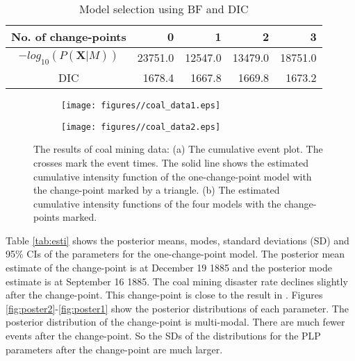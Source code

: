 \documentclass[12pt]{article}
\numberwithin{equation}{section}
\begin{document}
 \begin{table}[htbp]
   \centering
   \label{tbcoal}
   \caption{Model selection using BF and DIC}
     \begin{tabular}{crrrr}
         \hline
     No. of change-points & 0     & 1     & 2     & 3 \\
         \hline
     $-log_{10}(P(\pmb X|M))$ & \multicolumn{1}{r}{23751.0} & \multicolumn{1}{r}{12547.0} & \multicolumn{1}{r}{13479.0} & \multicolumn{1}{r}{18751.0} \\
     DIC   & 1678.4 & 1667.8 & 1669.8 & 1673.2 \\
         \hline
     \end{tabular}%
   \label{tab:data1}%
 \end{table}%

 
 
 \begin{figure}

     \centering
     \begin{subfigure}[b]{0.45\textwidth}
         \centering
         \texttt{[image: figures//coal\_data1.eps]}
         \caption{}
         \label{}
     \end{subfigure}
     \hfill
     \begin{subfigure}[b]{0.45\textwidth}
         \centering
         \texttt{[image: figures//coal\_data2.eps]}
         \caption{}
         \label{}
     \end{subfigure}
         \caption{The results of coal mining data: (a) The cumulative event plot. The crosses mark the event times. The solid line shows the estimated cumulative intensity function of the one-change-point model with the change-point marked by a triangle. (b) The estimated cumulative intensity functions of the four models with the change-points marked.}
        \label{fig:coal_data}
\end{figure}

Table \ref{tab:esti} shows the posterior means, modes, standard deviations (SD) and 95\% CIs of the parameters for the one-change-point model. The posterior mean estimate of the change-point is at December 19 1885 and the posterior mode estimate is at September 16 1885. The coal mining disaster rate declines slightly after the change-point. This change-point is close to the result in \citet{Raftery1986}. Figures \ref{fig:poster2}-\ref{fig:poster1} show the posterior distributions of each parameter. The posterior distribution of the change-point is multi-modal. There are much fewer events after the change-point. So the SDs of the distributions for the PLP parameters after the change-point are much larger.  
\end{document}
